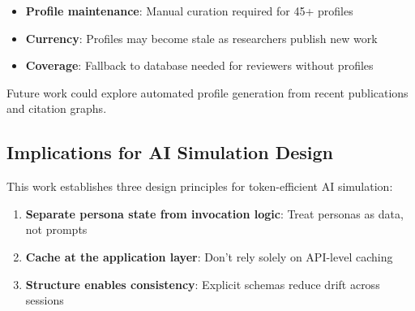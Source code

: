 \begin{itemize}
\item \textbf{Profile maintenance}: Manual curation required for 45+ profiles
\item \textbf{Currency}: Profiles may become stale as researchers publish new work
\item \textbf{Coverage}: Fallback to database needed for reviewers without profiles
\end{itemize}

Future work could explore automated profile generation from recent publications and citation graphs.

\subsection{Implications for AI Simulation Design}

This work establishes three design principles for token-efficient AI simulation:

\begin{enumerate}
\item \textbf{Separate persona state from invocation logic}: Treat personas as data, not prompts
\item \textbf{Cache at the application layer}: Don't rely solely on API-level caching
\item \textbf{Structure enables consistency}: Explicit schemas reduce drift across sessions
\end{enumerate}
